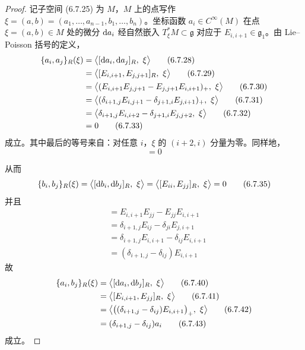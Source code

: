\begin{proof}
  记子空间 (6.7.25) 为 $M$，$M$ 上的点写作 $\xi=(a,b)=(a_1,\dots,a_{n-1},b_1,\dots,b_n)$。坐标函数 $a_i\in C^\infty(M)$ 在点 $\xi=(a,b)\in M$ 处的微分 $\mathrm{d} a_i$ 经自然嵌入 $T^*_\xi M\subset\mathfrak{g}$ 对应于 $E_{i,i+1}\in\mathfrak{g}_1$。由 Lie--Poisson 括号的定义，
  \begin{align}
    \{a_i,a_j\}_R(\xi) &= \bigl\langle [\rd a_i,\rd a_j]_R,\ \xi\bigr\rangle \tag{6.7.28}\\
    &= \bigl\langle [E_{i,i+1},E_{j,j+1}]_R,\ \xi\bigr\rangle \tag{6.7.29}\\
    &= \bigl\langle (E_{i,i+1}E_{j,j+1} - E_{j,j+1}E_{i,i+1})_+,\ \xi\bigr\rangle \tag{6.7.30}\\
    &= \bigl\langle (\delta_{i+1,j}E_{i,j+1} - \delta_{j+1,i}E_{j,i+1})_+,\ \xi\bigr\rangle \tag{6.7.31}\\
    &= \bigl\langle \delta_{i+1,j}E_{i,i+2} - \delta_{j+1,i}E_{j,j+2},\ \xi\bigr\rangle \tag{6.7.32}\\
    &= 0 \tag{6.7.33}
  \end{align}
  成立。其中最后的等号来自：对任意 $i$，$\xi$ 的 $(i+2,i)$ 分量为零。同样地，
  \begin{equation}
    [E_{i,i},E_{j,j}] = 0
    \tag{6.7.34}
  \end{equation}

从而
\begin{equation}
  \{b_i,b_j\}_R(\xi) = \bigl\langle [\mathrm{d} b_i,\mathrm{d} b_j]_R,\ \xi\bigr\rangle
  = \bigl\langle [E_{ii},E_{jj}]_R,\ \xi\bigr\rangle = 0
  \tag{6.7.35}
\end{equation}
并且
\begin{align}
  [E_{i,i+1},E_{jj}] &= E_{i,i+1}E_{jj} - E_{jj}E_{i,i+1} \tag{6.7.36}\\
  &= \delta_{i+1,j}E_{ij} - \delta_{ji}E_{j,i+1} \tag{6.7.37}\\
  &= \delta_{i+1,j}E_{i,i+1} - \delta_{ij}E_{i,i+1} \tag{6.7.38}\\
  &= (\delta_{i+1,j} - \delta_{ij})E_{i,i+1} \tag{6.7.39}
\end{align}
故
\begin{align}
  \{a_i,b_j\}_R(\xi) &= \bigl\langle [\rd a_i,\rd b_j]_R,\ \xi\bigr\rangle \tag{6.7.40}\\
  &= \bigl\langle [E_{i,i+1},E_{jj}]_R,\ \xi\bigr\rangle \tag{6.7.41}\\
  &= \bigl\langle \bigl((\delta_{i+1,j}-\delta_{ij})E_{i,i+1}\bigr)_+,\ \xi\bigr\rangle \tag{6.7.42}\\
  &= (\delta_{i+1,j}-\delta_{ij})a_i \tag{6.7.43}
\end{align}
成立。
\end{proof}


